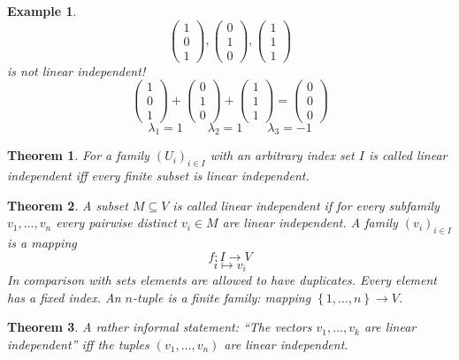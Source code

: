 \documentclass[a4paper,landscape,twocolumn]{article}
\newcommand\set[1]{\left\{#1\right\}}
\newtheorem{theorem}{Theorem}[section]
\newtheorem{ex}{Example}[section]
\begin{document}
\begin{ex}
  \[ \begin{pmatrix} 1 \\ 0 \\ 1 \end{pmatrix}, \begin{pmatrix} 0 \\ 1 \\ 0 \end{pmatrix}, \begin{pmatrix} 1 \\ 1 \\ 1 \end{pmatrix} \]
  is not linear independent!
  \[ \begin{pmatrix} 1 \\ 0 \\ 1 \end{pmatrix} + \begin{pmatrix} 0 \\ 1 \\ 0 \end{pmatrix} + \begin{pmatrix} 1 \\ 1 \\ 1 \end{pmatrix} = \begin{pmatrix} 0 \\ 0 \\ 0 \end{pmatrix} \]
  \[ \lambda_1 =  1 \qquad \lambda_2 = 1 \qquad \lambda_3 = -1 \]
\end{ex}

\begin{theorem}
  For a family $(U_i)_{i \in I}$ with an arbitrary index set $I$ is called linear independent
  iff every finite subset is linear independent.
\end{theorem}

\begin{theorem}
  A subset $M \subseteq V$ is called linear independent if for every subfamily $v_1, \ldots, v_n$ every pairwise distinct $v_i \in M$ are linear independent.
  A \emph{family} $(v_i)_{i \in I}$ is a mapping
  \[ f: I \rightarrow V \]
  \[ i \mapsto v_i \]
  In comparison with sets elements are allowed to have duplicates. Every element has a fixed index.
  An $n$-tuple is a finite family: mapping $\set{1, \ldots, n} \rightarrow V$.
\end{theorem}

\begin{theorem}
  A rather informal statement:
  \enquote{The vectors $v_1, \ldots, v_k$ are linear independent} iff the tuples $(v_1, \ldots, v_n)$ are linear independent.
\end{theorem}
\end{document}
